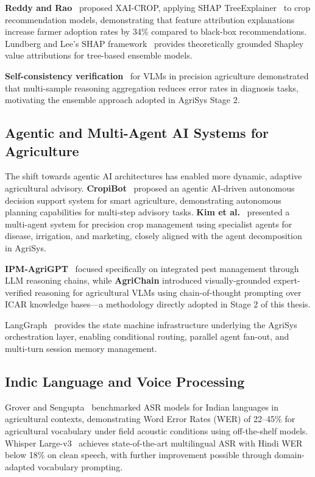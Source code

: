 \documentclass[12pt,a4paper]{article}
\begin{document}
\textbf{Reddy and Rao}~\cite{xaiCrop2024} proposed XAI-CROP, applying SHAP TreeExplainer~\cite{shap2017} to crop recommendation models, demonstrating that feature attribution explanations increase farmer adoption rates by 34\% compared to black-box recommendations. Lundberg and Lee's SHAP framework~\cite{shap2017} provides theoretically grounded Shapley value attributions for tree-based ensemble models.

\textbf{Self-consistency verification}~\cite{selfconsistency2025} for VLMs in precision agriculture demonstrated that multi-sample reasoning aggregation reduces error rates in diagnosis tasks, motivating the ensemble approach adopted in AgriSys Stage 2.

\subsection{Agentic and Multi-Agent AI Systems for Agriculture}

The shift towards agentic AI architectures has enabled more dynamic, adaptive agricultural advisory. \textbf{CropiBot}~\cite{cropibot2026} proposed an agentic AI-driven autonomous decision support system for smart agriculture, demonstrating autonomous planning capabilities for multi-step advisory tasks. \textbf{Kim et al.}~\cite{agenticmdpi2026} presented a multi-agent system for precision crop management using specialist agents for disease, irrigation, and marketing, closely aligned with the agent decomposition in AgriSys.

\textbf{IPM-AgriGPT}~\cite{ipmagrigpt2025} focused specifically on integrated pest management through LLM reasoning chains, while \textbf{AgriChain} \cite{agrichain2025} introduced visually-grounded expert-verified reasoning for agricultural VLMs using chain-of-thought prompting over ICAR knowledge bases---a methodology directly adopted in Stage 2 of this thesis.

LangGraph~\cite{langgraph2026} provides the state machine infrastructure underlying the AgriSys orchestration layer, enabling conditional routing, parallel agent fan-out, and multi-turn session memory management.

\subsection{Indic Language and Voice Processing}

Grover and Sengupta~\cite{indicasr2025} benchmarked ASR models for Indian languages in agricultural contexts, demonstrating Word Error Rates (WER) of 22--45\% for agricultural vocabulary under field acoustic conditions using off-the-shelf models. Whisper Large-v3~\cite{whisper2022} achieves state-of-the-art multilingual ASR with Hindi WER below 18\% on clean speech, with further improvement possible through domain-adapted vocabulary prompting.
\end{document}
